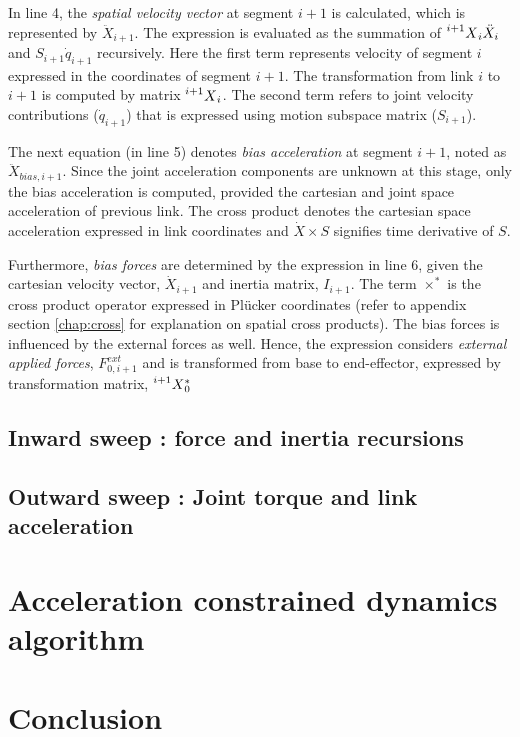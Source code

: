 In line 4, the \textit{spatial velocity vector} at segment $i+1$ is calculated, which is represented by $\ddot{X}_{i+1}$. The expression is evaluated as the summation of $\prescript{i+1}{}{X}_i\ddot{X}_i$ and  $S_{i+1}\dot{q}_{i+1}$ recursively. Here the first term represents velocity of segment $i$ expressed in the coordinates of segment $i+1$. The transformation from link $i$ to $i+1$ is computed by matrix $\prescript{i+1}{}{X}_{i}$. The second term refers to joint velocity contributions ($\dot{q}_{i+1}$) that is expressed using motion subspace matrix ($S_{i+1}$).

The next equation (in line 5) denotes \textit{bias acceleration} at segment $i+1$, noted as $\ddot{X}_{bias, i+1}$. Since the joint acceleration components are unknown at this stage, only the bias acceleration is computed, provided the cartesian and joint space acceleration of previous link. The cross product denotes the cartesian space acceleration expressed in link coordinates and $\dot{X} \times S$ signifies time derivative of $S$. 

Furthermore, \textit{bias forces} are determined by the expression in line 6, given the cartesian velocity vector, $\dot{X}_{i+1}$ and inertia matrix, $I_{i+1}$. The term $\times^*$ is the cross product operator expressed in Pl{\"u}cker coordinates (refer to appendix section \ref{chap:cross} for explanation on spatial cross products). The bias forces is influenced by the external forces as well. Hence, the expression considers \textit{external applied forces}, $F^{ext}_{0, i+1}$ and is transformed from base to end-effector, expressed by transformation matrix, $\prescript{i+1}{}{X}_0^*$


\subsection{Inward sweep : force and inertia recursions}

\subsection{Outward sweep : Joint torque and link acceleration }

\section{Acceleration constrained dynamics algorithm}

\section{Conclusion}


